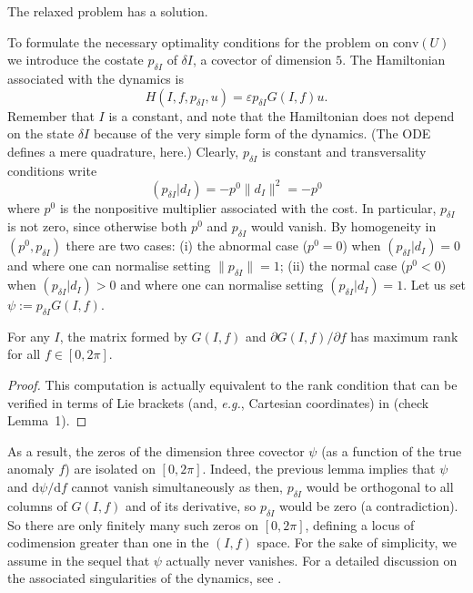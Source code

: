 \documentclass[AMA,STIX1COL]{WileyNJD-v2}
\newcommand{\conv}{\text{conv}}
\newcommand{\veps}{\varepsilon}
\begin{document}
\begin{proposition} \label{prop100}
The relaxed problem has a solution.
\end{proposition}

\noindent To formulate the necessary optimality conditions for the problem on $\conv(U)$
we introduce the costate $p_{\delta I}$ of $\delta I$, a covector of dimension $5$.
The Hamiltonian associated with the dynamics is
%
\begin{equation}
	\label{eq:hamiltonian}
	H(I, f, p_{\delta I}, u) = \veps p_{\delta I} G(I,f)u.
\end{equation}
%
Remember that $I$ is a constant, and note that the Hamiltonian does not depend on the state $\delta I$
because of the very simple form of the dynamics. (The ODE defines a mere quadrature, here.)
Clearly, $p_{\delta I}$ is constant and
transversality conditions write
\begin{equation} \label{eq113}
  (p_{\delta I} | d_I ) = -p^0 \|d_I\|^2 = -p^0
\end{equation}
where $p^0$ is the nonpositive multiplier associated with the cost. In particular, $p_{\delta I}$
is not zero, since otherwise both $p^0$ and $p_{\delta I}$ would vanish.
By homogeneity in $(p^0,p_{\delta I})$
there are two cases: (i) the abnormal case ($p^0=0$) when $(p_{\delta I} | d_I) = 0$ and where
one can normalise setting $\|p_{\delta I}\| = 1$; (ii) the normal case ($p^0<0$) when
$(p_{\delta I} | d_I) > 0$ and where one can normalise setting 
$(p_{\delta I} | d_I) = 1$. Let us set $\psi := p_{\delta I} G(I,f)$.

\begin{lemma} For any $I$, the matrix formed by $G(I,f)$ and $\partial G(I,f)/\partial f$
has maximum rank for all $f \in [0,2\pi]$.
\end{lemma}

\begin{proof} This computation is actually equivalent to the rank condition that can be verified
in terms of Lie brackets (and, \emph{e.g.}, Cartesian coordinates) in \cite{caillau-2012a}
(check Lemma~1).
\end{proof}

\noindent As a result, the zeros of the dimension three covector $\psi$ (as a function of the
true anomaly $f$) are isolated on $[0,2\pi]$. Indeed, the previous lemma implies that
$\psi$ and $\mathrm{d}\psi/\mathrm{d}f$ cannot vanish simultaneously as then, $p_{\delta I}$
would be orthogonal to all columns of $G(I,f)$ and of
its derivative, so $p_{\delta I}$ would be zero
(a contradiction). So there are only finitely many such zeros on $[0,2\pi]$, defining a locus
of codimension greater than one in the $(I,f)$ space.  
For the sake of simplicity, we assume in the sequel that $\psi$ actually
never vanishes. For a detailed discussion on the associated singularities of the dynamics, see
\cite{caillau-2022a}. 
\end{document}
